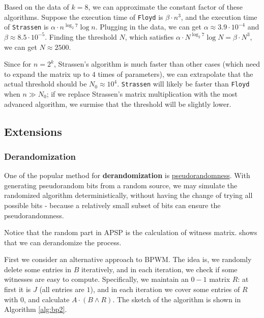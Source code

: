 \documentclass[12pt]{article}
\theoremstyle{plain}
\begin{document}
Based on the data of $k=8$, we can approximate the constant factor of these algorithms. Suppose the execution time of \texttt{Floyd} is $\beta\cdot n^3$, and the execution time of \texttt{Strassen} is $\alpha\cdot n^{\log_2 7}\log n$. Plugging in the data, we can get $\alpha\approx 3.9\cdot 10^{-4}$ and $\beta\approx 8.5\cdot 10^{-5}$. Finding the threshold $N$, which satisfies $\alpha\cdot N^{\log_2 7}\log N=\beta\cdot N^3$, we can get $N\approx 2500$. 

Since for $n=2^k$, Strassen's algorithm is much faster than other cases (which need to expand the matrix up to $4$ times of parameters), we can extrapolate that the actual threshold should be $N_0\approx 10^4$. \texttt{Strassen} will likely be faster than \texttt{Floyd} when $n\gg N_0$; if we replace Strassen's matrix multiplication with the most advanced algorithm, we surmise that the threshold will be slightly lower.

\subsection{Extensions}

\subsubsection{Derandomization}

One of the popular method for \textbf{derandomization} is \underline{pseudorandomness}. With generating pseudorandom bits from a random source, we may simulate the randomized algorithm deterministically, without having the change of trying all possible bits - because a relatively small subset of bits can ensure the pseudorandomness.

Notice that the random part in APSP is the calculation of witness matrix. \cite{267748} shows that we can derandomize the process. 

First we consider an alternative approach to BPWM. The idea is, we randomly delete some entries in $B$ iteratively, and in each iteration, we check if some witnesses are easy to compute. Specifically, we maintain an $0-1$ matrix $R$: at first it is $J$ (all entries are $1$), and in each iteration we cover some entries of $R$ with $0$, and calculate $A\cdot (B\land R)$. The sketch of the algorithm is shown in Algorithm \ref{alg:bp2}.
\end{document}
